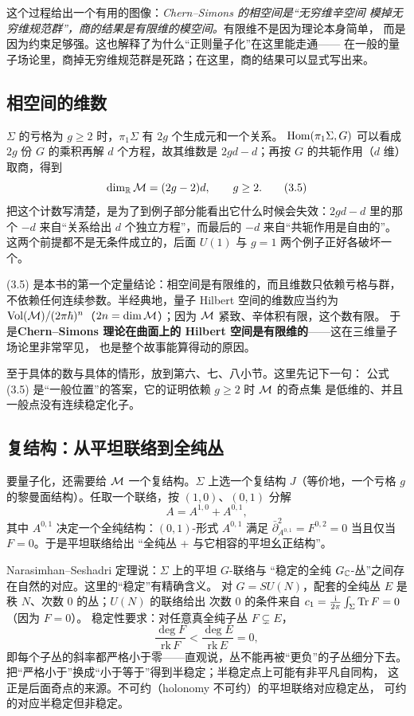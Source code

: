 这个过程给出一个有用的图像：\emph{Chern--Simons 的相空间是“无穷维辛空间
模掉无穷维规范群”，商的结果是有限维的模空间。}有限维不是因为理论本身简单，
而是因为约束足够强。这也解释了为什么“正则量子化”在这里能走通——
在一般的量子场论里，商掉无穷维规范群是死路；在这里，商的结果可以显式写出来。

\subsection{相空间的维数}

$\Sigma$ 的亏格为 $g\ge2$ 时，$\pi_1\Sigma$ 有 $2g$ 个生成元和一个关系。
$\operatorname{Hom}(\pi_1\Sigma,G)$ 可以看成 $2g$ 份 $G$ 的乘积再解 $d$ 个方程，故其维数是
$2gd-d$；再按 $G$ 的共轭作用（$d$ 维）取商，得到
\begin{equation}
\dim_{\mathbb{R}}\mathcal{M}=(2g-2)d,\qquad g\ge2. \tag{3.5}
\end{equation}
把这个计数写清楚，是为了到例子部分能看出它什么时候会失效：$2gd-d$ 里的那个
$-d$ 来自“关系给出 $d$ 个独立方程”，而最后的 $-d$ 来自“共轭作用是自由的”。
这两个前提都不是无条件成立的，后面 $U(1)$ 与 $g=1$ 两个例子正好各破坏一个。

(3.5) 是本书的第一个定量结论：相空间是有限维的，而且维数只依赖亏格与群，
不依赖任何连续参数。半经典地，量子 Hilbert 空间的维数应当约为
$\mathrm{Vol}(\mathcal{M})/(2\pi\hbar)^{n}$（$2n=\dim\mathcal{M}$）；因为 $\mathcal{M}$ 紧致、辛体积有限，这个数有限。
于是\textbf{Chern--Simons 理论在曲面上的 Hilbert 空间是有限维的}——这在三维量子场论里非常罕见，
也是整个故事能算得动的原因。

至于具体的数与具体的情形，放到第六、七、八小节。这里先记下一句：
公式 (3.5) 是“一般位置”的答案，它的证明依赖 $g\ge2$ 时 $\mathcal{M}$ 的奇点集
是低维的、并且一般点没有连续稳定化子。

\subsection{复结构：从平坦联络到全纯丛}

要量子化，还需要给 $\mathcal{M}$ 一个复结构。$\Sigma$ 上选一个复结构 $J$（等价地，一个亏格 $g$
的黎曼面结构）。任取一个联络，按 $(1,0)$、$(0,1)$ 分解
\[
A=A^{1,0}+A^{0,1},
\]
其中 $A^{0,1}$ 决定一个全纯结构：$(0,1)$-形式 $A^{0,1}$ 满足
$\bar\partial_{A^{0,1}}^2=F^{0,2}=0$ 当且仅当 $F=0$。于是平坦联络给出
“全纯丛 + 与它相容的平坦幺正结构”。

Narasimhan--Seshadri 定理说：$\Sigma$ 上的平坦 $G$-联络与
“稳定的全纯 $G_{\mathbb{C}}$-丛”之间存在自然的对应。这里的“稳定”有精确含义。
对 $G=SU(N)$，配套的全纯丛 $E$ 是秩 $N$、次数 $0$ 的丛；$U(N)$ 的联络给出
次数 $0$ 的条件来自 $c_1=\frac{\mathrm{i}}{2\pi}\int_\Sigma\operatorname{Tr} F=0$（因为 $F=0$）。
稳定性要求：对任意真全纯子丛 $F\subsetneq E$，
\[
\frac{\deg F}{\mathrm{rk}\,F}<\frac{\deg E}{\mathrm{rk}\,E}=0,
\]
即每个子丛的斜率都严格小于零——直观说，丛不能再被“更负”的子丛细分下去。
把“严格小于”换成“小于等于”得到半稳定；半稳定点上可能有非平凡自同构，
这正是后面奇点的来源。不可约（holonomy 不可约）的平坦联络对应稳定丛，
可约的对应半稳定但非稳定。

